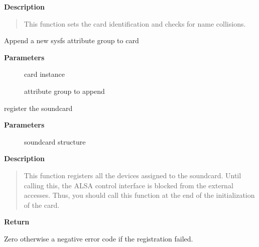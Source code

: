 \documentclass[a4paper,8pt,english]{sphinxmanual}
\begin{document}
\textbf{Description}
\begin{quote}

This function sets the card identification and checks for name
collisions.
\end{quote}

\begin{fulllineitems}
\label{sound/kernel-api/alsa-driver-api:c.snd_card_add_dev_attr}
Append a new sysfs attribute group to card

\end{fulllineitems}


\textbf{Parameters}
\begin{description}
\item[{}] \leavevmode
card instance

\item[{}] \leavevmode
attribute group to append

\end{description}

\begin{fulllineitems}
\label{sound/kernel-api/alsa-driver-api:c.snd_card_register}
register the soundcard

\end{fulllineitems}


\textbf{Parameters}
\begin{description}
\item[{}] \leavevmode
soundcard structure

\end{description}

\textbf{Description}
\begin{quote}

This function registers all the devices assigned to the soundcard.
Until calling this, the ALSA control interface is blocked from the
external accesses.  Thus, you should call this function at the end
of the initialization of the card.
\end{quote}

\textbf{Return}

Zero otherwise a negative error code if the registration failed.
\end{document}
